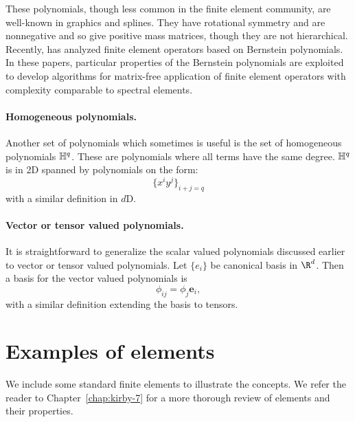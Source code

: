 These polynomials, though less common in the finite element community,
are well-known in graphics and splines.  They have rotational symmetry
and are nonnegative and so give positive mass matrices, though
they are not hierarchical.  Recently, \citet{Kirby2009,Kirby2010}
has analyzed finite element operators based on Bernstein polynomials.
In these papers, particular properties of the Bernstein polynomials are
exploited to develop algorithms for matrix-free application of finite
element operators with complexity comparable to spectral elements.


\paragraph{Homogeneous polynomials.}
\label{sec:homo:pol}
Another set of polynomials which sometimes is useful is the set of
homogeneous polynomials ${\mathbb H}^q$. These are polynomials where all terms
have the same degree. ${\mathbb H}^q$ is in 2D spanned by polynomials on the form:
\begin{equation}
\{ x^i y^j \}_{i+j=q}
\end{equation}
with a similar definition in $d$D.

\paragraph{Vector or tensor valued polynomials.}
It is straightforward to generalize the scalar valued polynomials
discussed earlier to vector or tensor valued polynomials. Let $\{e_i\}$
be canonical basis in $\R^d$. Then a basis for the vector valued
polynomials is
\begin{equation}
\phi_{ij} = \phi_j \mathbf{e}_i,
\end{equation}
with a similar definition extending the basis to tensors.


\section{Examples of elements}

We include some standard finite elements to illustrate the concepts.
We refer the reader to Chapter~\ref{chap:kirby-7} for a more thorough
review of elements and their properties.

